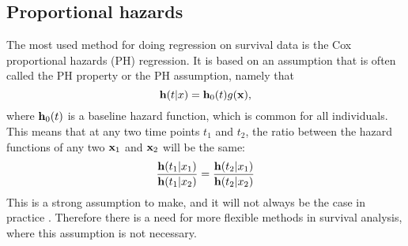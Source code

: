 \subsection{Proportional hazards}
The most used method for doing regression on survival data is the Cox proportional hazards (PH) regression. It is based on an assumption that is often called the PH property or the PH assumption, namely that
\begin{equation}
    \mathbf{h}(t|x)=\mathbf{h}_0(t)g(\mathbf{x}),
\end{equation}
where $\mathbf{h}_0(t)$ is a baseline hazard function, which is common for all individuals. This means that at any two time points $t_1$ and $t_2$, the ratio between the hazard functions of any two $\mathbf{x}_1$ and $\mathbf{x}_2$ will be the same:
\begin{equation}
    \frac{\mathbf{h}(t_1|x_1)}{\mathbf{h}(t_1|x_2)}=\frac{\mathbf{h}(t_2|x_1)}{\mathbf{h}(t_2|x_2)}
\end{equation}
This is a strong assumption to make, and it will not always be the case in practice \citep{lee2010}. Therefore there is a need for more flexible methods in survival analysis, where this assumption is not necessary.

